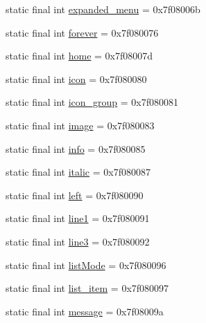 \begin{DoxyCompactItemize}
\item 
static final int \mbox{\hyperlink{classandroid_1_1support_1_1v7_1_1appcompat_1_1_r_1_1id_a3aa9e89f2cfd5dd834212e9e9d185a81}{expanded\+\_\+menu}} = 0x7f08006b
\item 
static final int \mbox{\hyperlink{classandroid_1_1support_1_1v7_1_1appcompat_1_1_r_1_1id_ac482eacd695f4a22c19507fd2a40f696}{forever}} = 0x7f080076
\item 
static final int \mbox{\hyperlink{classandroid_1_1support_1_1v7_1_1appcompat_1_1_r_1_1id_acedb19aa69792f84b956f8fb7cc4b972}{home}} = 0x7f08007d
\item 
static final int \mbox{\hyperlink{classandroid_1_1support_1_1v7_1_1appcompat_1_1_r_1_1id_a4aedeaf21775058da43c7431df03fd74}{icon}} = 0x7f080080
\item 
static final int \mbox{\hyperlink{classandroid_1_1support_1_1v7_1_1appcompat_1_1_r_1_1id_ae198dc56dc986e6073f5d91f1e57de9b}{icon\+\_\+group}} = 0x7f080081
\item 
static final int \mbox{\hyperlink{classandroid_1_1support_1_1v7_1_1appcompat_1_1_r_1_1id_ab241f4f2c0eadbf28120bd907d5756c7}{image}} = 0x7f080083
\item 
static final int \mbox{\hyperlink{classandroid_1_1support_1_1v7_1_1appcompat_1_1_r_1_1id_a38db22f7031085d2c98980b68baa9d2c}{info}} = 0x7f080085
\item 
static final int \mbox{\hyperlink{classandroid_1_1support_1_1v7_1_1appcompat_1_1_r_1_1id_aa78c67a96c1621bd6c977ed72aad9094}{italic}} = 0x7f080087
\item 
static final int \mbox{\hyperlink{classandroid_1_1support_1_1v7_1_1appcompat_1_1_r_1_1id_ad576f6e1dd1ecb9ceb61dca934fa9e2f}{left}} = 0x7f080090
\item 
static final int \mbox{\hyperlink{classandroid_1_1support_1_1v7_1_1appcompat_1_1_r_1_1id_a89744f9f50d9da0cb8219f081a2bc47e}{line1}} = 0x7f080091
\item 
static final int \mbox{\hyperlink{classandroid_1_1support_1_1v7_1_1appcompat_1_1_r_1_1id_ac494a9871238dcf6ff5a1debc911c999}{line3}} = 0x7f080092
\item 
static final int \mbox{\hyperlink{classandroid_1_1support_1_1v7_1_1appcompat_1_1_r_1_1id_a523b582894e761fb50c74f46aaa26448}{list\+Mode}} = 0x7f080096
\item 
static final int \mbox{\hyperlink{classandroid_1_1support_1_1v7_1_1appcompat_1_1_r_1_1id_acbc2d1a0b0995143f0b7c4c223f75d3f}{list\+\_\+item}} = 0x7f080097
\item 
static final int \mbox{\hyperlink{classandroid_1_1support_1_1v7_1_1appcompat_1_1_r_1_1id_ae113da02d5d7919e91a660272de7ccfd}{message}} = 0x7f08009a

\end{DoxyCompactItemize}
